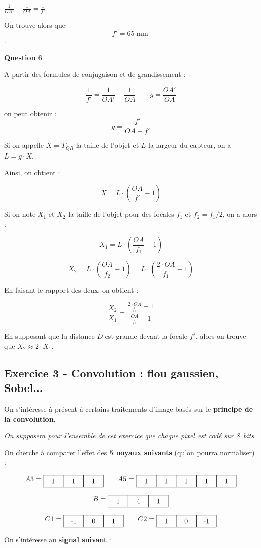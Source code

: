 \documentclass[a4paper,11pt,twoside]{book} %
\newcommand{\kernel}[1]{ 
	\begin{tikzpicture}[baseline=(current bounding box.center)] \foreach \val [count=\i] in {#1} { \draw (\i-1,0) rectangle (\i,0.6); \node at (\i-.5,.3) {\val}; } \end{tikzpicture} 
	}
\begin{document}
$\frac{1}{OA'} - \frac{1}{OA} = \frac{1}{f'}$

On trouve alors que $$f' = 65\operatorname{mm}$$.


\medskip
\textbf{Question 6}

A partir des formules de conjugaison et de grandissement : 

$$\frac{1}{f'} = \frac{1}{OA'} - \frac{1}{OA} \qquad g = \frac{OA'}{OA}$$

on peut obtenir : $$g = \frac{f'}{OA -f'}$$

Si on appelle $X = T_{QR}$ la taille de l'objet et $L$ la largeur du capteur, on a $L = g \cdot X$.

Ainsi, on obtient : 

$$X = L \cdot (\frac{OA}{f'} - 1)$$

Si on note $X_1$ et $X_2$ la taille de l'objet pour des focales $f_1$ et $f_2 = f_1 / 2$, on a alors :

$$X_1 = L \cdot (\frac{OA}{f_1} - 1)$$ 

$$X_2 = L \cdot (\frac{OA}{f_2} - 1) = L \cdot (\frac{2 \cdot OA}{f_1} - 1)$$

En faisant le rapport des deux, on obtient : 

$$ \frac{X_2}{X_1} = \frac{\frac{2 \cdot OA}{f_1} - 1}{\frac{OA}{f_1} - 1}$$

En supposant que la distance $D$ est grande devant la focale $f'$, alors on trouve que $X_2 \approx 2 \cdot X_1$.

\newpage
\subsection{Exercice 3 - Convolution : flou gaussien, Sobel...}

On s'intéresse à présent à certains traitements d'image basés sur le \textbf{principe de la convolution}.

\textit{On supposera pour l'ensemble de cet exercice que chaque pixel est codé sur 8~bits.}

On cherche à comparer l'effet des \textbf{5 noyaux suivants} (qu'on pourra normaliser) :

$$ A3 = \kernel{1,1,1} \qquad A5 = \kernel{1,1,1,1,1} $$

$$ B = \kernel{1,4,1}$$

$$ C1 = \kernel{-1,0,1} \qquad C2 = \kernel{1,0,-1} $$

\bigskip

On s'intéresse au \textbf{signal suivant} :
\end{document}
